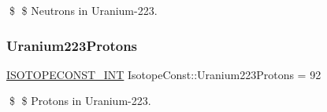 \$ \$ Neutrons in Uranium-\/223. \mbox{\label{group___isotope_const-_uranium-_u223_ga871595bcd29d118a6274d8a52c913369}} 
\subsubsection{\texorpdfstring{Uranium223\+Protons}{Uranium223Protons}}
{\footnotesize\ttfamily \mbox{\hyperlink{group___isotope_const-_macros_ga5f18360b3e99483a35c32d789e62621c}{I\+S\+O\+T\+O\+P\+E\+C\+O\+N\+S\+T\+\_\+\+I\+NT}} Isotope\+Const\+::\+Uranium223\+Protons = 92}

\$ \$ Protons in Uranium-\/223. 